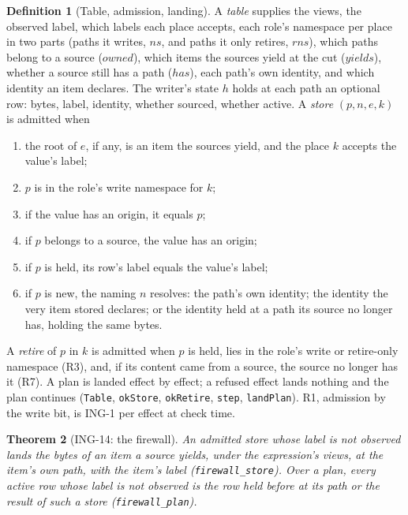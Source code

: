 \documentclass[11pt]{article}
\theoremstyle{plain}
\newtheorem{theorem}{Theorem}[section]
\theoremstyle{definition}
\newtheorem{definition}[theorem]{Definition}
\theoremstyle{remark}
\newcommand{\lean}[1]{\texttt{#1}}
\newcommand{\ing}[1]{ING-#1}
\begin{document}
\begin{definition}[Table, admission, landing]
A \emph{table} supplies the views, the observed label, which labels each place accepts, each
role's namespace per place in two parts (paths it writes, $\mathit{ns}$, and paths it only
retires, $\mathit{rns}$), which paths belong to a source ($\mathit{owned}$), which items the
sources yield at the cut ($\mathit{yields}$), whether a source still has a path
($\mathit{has}$), each path's own identity, and which identity an item declares. The writer's
state $h$ holds at each path an optional row: bytes, label, identity, whether sourced, whether
active. A \emph{store} $(p, n, e, k)$ is admitted when
\begin{enumerate}
\item[R2] the root of $e$, if any, is an item the sources yield, and the place $k$ accepts the
  value's label;
\item[R3] $p$ is in the role's write namespace for $k$;
\item[R4] if the value has an origin, it equals $p$;
\item[R8] if $p$ belongs to a source, the value has an origin;
\item[R5] if $p$ is held, its row's label equals the value's label;
\item[R6] if $p$ is new, the naming $n$ resolves: the path's own identity; the identity the very
  item stored declares; or the identity held at a path its source no longer has, holding the
  same bytes.
\end{enumerate}
A \emph{retire} of $p$ in $k$ is admitted when $p$ is held, lies in the role's write or
retire-only namespace (R3), and, if its content came from a source, the source no longer has it
(R7). A plan is landed effect by effect; a refused effect lands nothing and the plan continues
(\lean{Table}, \lean{okStore}, \lean{okRetire}, \lean{step}, \lean{landPlan}). R1, admission by
the write bit, is \ing{1} per effect at check time.
\end{definition}

\begin{theorem}[\ing{14}: the firewall]
An admitted store whose label is not observed lands the bytes of an item a source yields, under
the expression's views, at the item's own path, with the item's label
(\lean{firewall\_store}). Over a plan, every active row whose label is not observed is the row
held before at its path or the result of such a store (\lean{firewall\_plan}).
\end{theorem}
\end{document}
